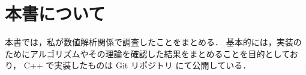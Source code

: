 %

\chapter{本書について}

本書では，私が数値解析関係で調査したことをまとめる．
基本的には，実装のためにアルゴリズムやその理論を確認した結果をまとめることを目的としており，
C++ で実装したものは Git リポジトリ \cite{NumericalCollectionCpp} にて公開している．
